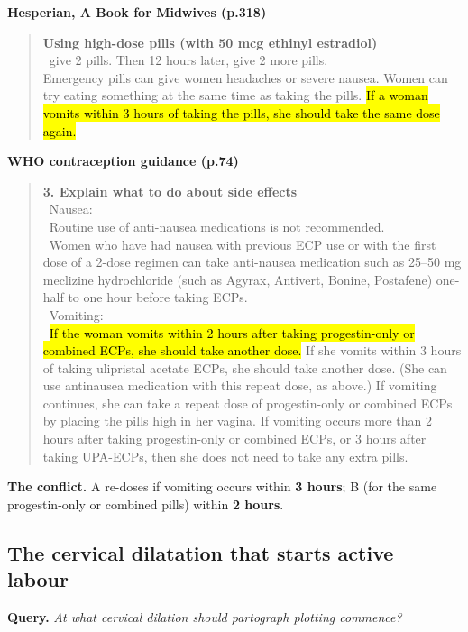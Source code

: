 \smallskip
\noindent\textbf{Hesperian, A Book for Midwives (p.318)}
\begin{quote}\footnotesize
\textbf{Using high-dose pills (with 50 mcg ethinyl estradiol)}\\
\textbullet\ give 2 pills. Then 12 hours later, give 2 more pills.\\
Emergency pills can give women headaches or severe nausea. Women can try eating something at the same time as taking the pills. \hl{If a woman vomits within 3 hours of taking the pills, she should take the same dose again.}
\end{quote}
\noindent\textbf{WHO contraception guidance (p.74)}
\begin{quote}\footnotesize
\textbf{3. Explain what to do about side effects}\\
\textbullet\ Nausea:\\
\textbullet\ Routine use of anti-nausea medications is not recommended.\\
\textbullet\ Women who have had nausea with previous ECP use or with the first dose of a 2-dose regimen can take anti-nausea medication such as 25–50 mg meclizine hydrochloride (such as Agyrax, Antivert, Bonine, Postafene) one-half to one hour before taking ECPs.\\
\textbullet\ Vomiting:\\
\textbullet\ \hl{If the woman vomits within 2 hours after taking progestin-only or combined ECPs, she should take another dose.} If she vomits within 3 hours of taking ulipristal acetate ECPs, she should take another dose. (She can use antinausea medication with this repeat dose, as above.) If vomiting continues, she can take a repeat dose of progestin-only or combined ECPs by placing the pills high in her vagina. If vomiting occurs more than 2 hours after taking progestin-only or combined ECPs, or 3 hours after taking UPA-ECPs, then she does not need to take any extra pills.
\end{quote}
\noindent\textbf{The conflict.} A re-doses if vomiting occurs within \textbf{3 hours}; B (for the same progestin-only or combined pills) within \textbf{2 hours}.

\subsection*{The cervical dilatation that starts active labour}
\noindent\textbf{Query.} \emph{At what cervical dilation should partograph plotting commence?}

